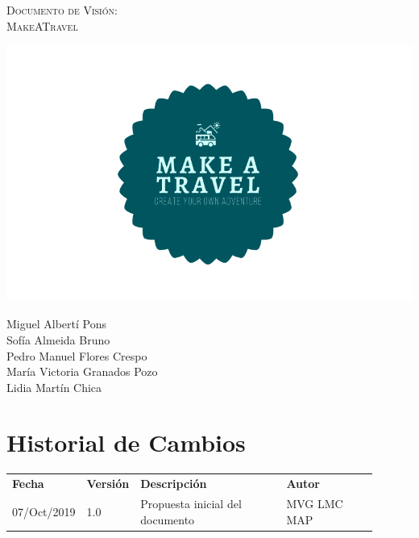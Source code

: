 \documentclass[11pt]{article}
\begin{document}
\begin{titlepage}
\centering
\vspace{4.5cm}
{\scshape\LARGE Documento de Visión:\\MakeATravel \par}
\vspace{1.5cm}

\includegraphics[width=16cm]{Logo}

\vspace{3cm}
{\scshape\large \par}
\vspace{1cm}

{Miguel Albertí Pons\\
Sofía Almeida Bruno\\
Pedro Manuel Flores Crespo\\
María Victoria Granados Pozo\\
Lidia Martín Chica
\par}

\end{titlepage}
\newpage

\section*{Historial de Cambios}
\begin{table}[H]
  \centering
  \begin{tabular}{p{0.15\linewidth}p{0.1\linewidth}p{0.4\linewidth}p{0.25\linewidth}}
    \toprule
    \textbf{Fecha} & \textbf{Versión} & \textbf{Descripción} & \textbf{Autor}\\
    07/Oct/2019 & 1.0 & Propuesta inicial del documento & MVG LMC MAP\\
    \midrule
    \bottomrule
  \end{tabular}
\end{table}
\newpage
\end{document}
